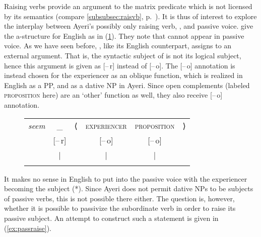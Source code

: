 Raising verbs provide an argument to the matrix predicate which is not licensed
by its semantics (compare \autoref{subsubsec:raisvb},
p.~\pageref{subsubsec:raisvb}). It is thus of interest to explore the interplay
between Ayeri's possibly only raising verb, , and
passive voice. \citet{bresnan2016} give the a-structure for English
 as in (\ref{ex:engseemastruct}). They note that  cannot
appear in passive voice. As we have seen before, , like
its English counterpart, assigns \Subj{} to an external argument. That is, the
syntactic subject of  is not its logical subject, hence this argument
is given as [–\,r] instead of [–\,o]. The \mbox{[–\,o]} annotation is instead chosen for the
experiencer as an oblique function, which is realized in English as a PP, and
as a dative NP in Ayeri. Since open complements (labeled \textsc{proposition} here)
are an `other' function as well, they also receive [–\,o] annotation.

\begin{figure}
\ex\label{ex:engseemastruct}
\begin{tabular}[t]{@{} >{\itshape}l c l c c r}
seem
	& \_
	& ⟨
	& \textsc{experiencer}
	& \textsc{proposition}
	& ⟩
	\\
%
	& [–\,r]
	& %
	& [–\,o]
	& [–\,o]
	& %
	\\

%
	& |
	& %
	& |
	& |
	& %
	\\

%
	& \Subj
	& %
	& \Oblq{exp}
	& \XCompl
	& %
	\\
\end{tabular}

\xe
\end{figure}

It makes no sense in English to put  into the passive voice with the
experiencer becoming the subject (*). Since Ayeri does not
permit dative NPs to be subjects of passive verbs, this is not possible 
there either. The question is, however, whether it is possible to passivize the
subordinate verb in order to raise its passive subject. An attempt to construct
such a statement is given in (\ref{ex:passraise}).

